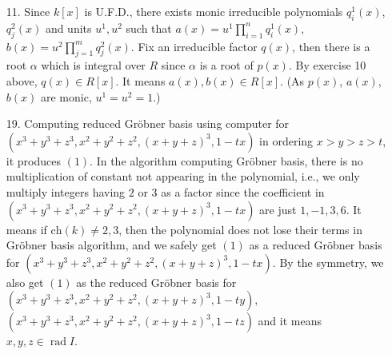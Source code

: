 \documentclass[12pt]{article}
\DeclareMathOperator{\rad}{\mathrm{rad}}
\begin{document}
\begin{enumerate}
\item[11.] Since $k[x]$ is U.F.D., there exists monic irreducible polynomials $q^1_i(x)$, $q^2_j(x)$ and units $u^1,u^2$ such that $a(x)=u^1\prod_{i=1}^n q^1_i(x)$, $b(x)=u^2\prod_{j=1}^m q^2_j(x)$. Fix an irreducible factor $q(x)$, then there is a root $\alpha$ which is integral over $R$ since $\alpha$ is a root of $p(x)$. By exercise 10 above, $q(x)\in R[x]$. It means $a(x),b(x)\in R[x]$. (As $p(x)$, $a(x)$, $b(x)$ are monic, $u^1=u^2=1$.)
\newpage


\item[19.]
Computing reduced Gr\"obner basis using computer for $(x^3+y^3+z^3, x^2+y^2+z^2, (x+y+z)^3, 1-tx)$ in ordering $x>y>z>t$, it produces $(1)$. In the algorithm computing Gr\"obner basis, there is no multiplication of constant not appearing in the polynomial, i.e., we only multiply integers having $2$ or $3$ as a factor since the coefficient in $(x^3+y^3+z^3, x^2+y^2+z^2, (x+y+z)^3, 1-tx)$ are just $1, -1, 3,6$. It means if $\text{ch}(k)\neq 2,3$, then the polynomial does not lose their terms in Gr\"obner basis algorithm, and we safely get $(1)$ as a reduced Gr\"obner basis for $(x^3+y^3+z^3, x^2+y^2+z^2, (x+y+z)^3, 1-tx)$. By the symmetry, we also get $(1)$ as the reduced Gr\"obner basis for $(x^3+y^3+z^3, x^2+y^2+z^2, (x+y+z)^3, 1-ty)$, $(x^3+y^3+z^3, x^2+y^2+z^2, (x+y+z)^3, 1-tz)$ and it means $x,y,z\in \rad I$.
\newpage



\end{enumerate}
\end{document}
